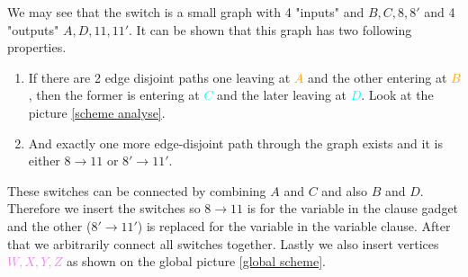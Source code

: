 We may see that the switch is a small graph with 4 "inputs" and $B, C, 8, 8'$ and 4 "outputs" $A, D, 11, 11'$. It can be shown that this graph has two following properties.

\begin{enumerate}
	\item If there are 2 edge disjoint paths one leaving at \textcolor{orange}{$A$} and the other entering at \textcolor{orange}{$B$}, then the former is entering at \textcolor{cyan}{$C$} and the later leaving at \textcolor{cyan}{$D$}. Look at the picture \ref{scheme analyse}.
	\item And exactly one more edge-disjoint path through the graph exists and it is either $8 \to 11$ or $8' \to 11'$.
\end{enumerate}

These switches can be connected by combining $A$ and $C$ and also $B$ and $D$. Therefore we insert the switches so $8 \to 11$ is for the variable in the clause gadget and the other ($8' \to 11'$) is replaced for the variable in the variable clause. After that we arbitrarily connect all switches together. Lastly we also insert vertices \textcolor{violet}{$W, X, Y, Z$} as shown on the global picture \ref{global scheme}.

